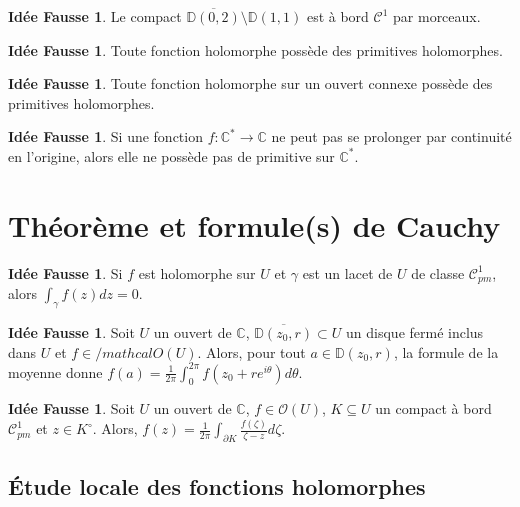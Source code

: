 \documentclass[11pt,a4paper]{article}
\newcommand{\D}{\mathbb{D}}
\newcommand{\C}{\mathbb{C}}
\theoremstyle{definition}
\newtheorem{ideeFausse}[theoreme]{Idée Fausse}
\theoremstyle{plain}
\begin{document}
\begin{ideeFausse}
Le compact $\overline{\D(0,2)} \setminus \D(1,1)$ est à bord $\mathcal C^1$ par morceaux.
\end{ideeFausse}


\begin{ideeFausse}
Toute fonction holomorphe possède des primitives holomorphes.
\end{ideeFausse}

\begin{ideeFausse}
Toute fonction holomorphe sur un ouvert connexe possède des primitives holomorphes.
\end{ideeFausse}

\begin{ideeFausse}
Si une fonction $f : \C^*\to \C$ ne peut pas se prolonger par continuité en l'origine, alors elle ne possède pas de primitive sur $\C^*$.
\end{ideeFausse}



\section{Théorème et formule(s) de Cauchy}

\begin{ideeFausse}
Si $f$ est holomorphe sur $U$ et $\gamma$ est un lacet de $U$ de classe $\mathcal C^1_{pm}$, alors $\int_\gamma f(z)dz=0$.
\end{ideeFausse}

\begin{ideeFausse}
Soit $U$ un ouvert de $\C$, $\overline{\D(z_0,r)} \subset U$ un disque fermé inclus dans $U$ et $f\in /mathcal O(U)$.
Alors, pour tout $a \in \D(z_0,r)$, la formule de la moyenne donne $f(a) = \frac{1}{2\pi}\int_0^{2\pi} f\left(z_0+re^{i\theta}\right)d\theta$.
\end{ideeFausse}

\begin{ideeFausse}
Soit $U$ un ouvert de $\C$, $f\in \mathcal O(U)$, $K\subseteq U$ un compact à bord $\mathcal C^1_{pm}$ et $z\in K^\circ$.
Alors, $f(z) =\frac{1}{2\pi} \int_{\partial K}\frac{f(\zeta)}{\zeta-z}d\zeta $.
\end{ideeFausse}

\subsection{Étude locale des fonctions holomorphes}

%
%
%
%
\end{document}
